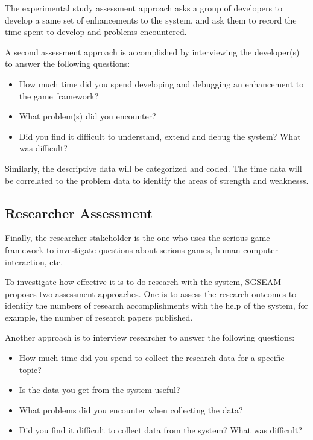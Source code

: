 The experimental study assessment approach asks a group of developers to develop a same set of
enhancements to the system, and ask them to record the time spent to develop and problems
encountered.

A second assessment approach is accomplished by interviewing the developer(s) to
answer the following questions:

\begin{itemize}
\item How much time did you spend developing and debugging an
  enhancement to the game framework?
\item What problem(s) did you encounter?
\item Did you find it difficult to understand, extend and debug the
  system? What was difficult?
\end{itemize}

Similarly, the descriptive data will be categorized and coded. The time data will be correlated to the problem data to identify the areas of strength and weaknesss.

\subsection{Researcher Assessment}

Finally, the researcher stakeholder is the one who uses the serious game framework to
investigate questions about serious games, human computer interaction, etc.

To investigate how effective it is to do research with the system, SGSEAM proposes two assessment
approaches. One is to assess the research outcomes to identify the numbers of research
accomplishments with the help of the system, for example, the number of research papers published.

Another approach is to interview researcher to answer the following questions:
\begin{itemize}
\item How much time did you spend to collect the research data for a
  specific topic?
\item Is the data you get from the system useful?
\item What problems did you encounter when collecting the data?
\item Did you find it difficult to collect data from the system?
  What was difficult?
\end{itemize}
